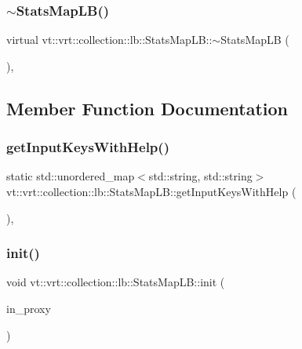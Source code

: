 \subsubsection{\texorpdfstring{$\sim$\+Stats\+Map\+L\+B()}{~StatsMapLB()}}
{\footnotesize\ttfamily virtual vt\+::vrt\+::collection\+::lb\+::\+Stats\+Map\+L\+B\+::$\sim$\+Stats\+Map\+LB (\begin{DoxyParamCaption}{ }\end{DoxyParamCaption})\hspace{0.3cm}{\ttfamily [virtual]}, {\ttfamily [default]}}



\subsection{Member Function Documentation}
\mbox{\label{structvt_1_1vrt_1_1collection_1_1lb_1_1_stats_map_l_b_ab795f35642e78ff8b01cdd7440a053e2}} 
\subsubsection{\texorpdfstring{get\+Input\+Keys\+With\+Help()}{getInputKeysWithHelp()}}
{\footnotesize\ttfamily static std\+::unordered\+\_\+map$<$std\+::string, std\+::string$>$ vt\+::vrt\+::collection\+::lb\+::\+Stats\+Map\+L\+B\+::get\+Input\+Keys\+With\+Help (\begin{DoxyParamCaption}{ }\end{DoxyParamCaption})\hspace{0.3cm}{\ttfamily [inline]}, {\ttfamily [static]}}

\mbox{\label{structvt_1_1vrt_1_1collection_1_1lb_1_1_stats_map_l_b_a5af7ebfa026d3b236fee88bc2b5d139e}} 
\subsubsection{\texorpdfstring{init()}{init()}}
{\footnotesize\ttfamily void vt\+::vrt\+::collection\+::lb\+::\+Stats\+Map\+L\+B\+::init (\begin{DoxyParamCaption}\item[{\hyperlink{structvt_1_1objgroup_1_1proxy_1_1_proxy}{objgroup\+::proxy\+::\+Proxy}$<$ \hyperlink{structvt_1_1vrt_1_1collection_1_1lb_1_1_stats_map_l_b}{Stats\+Map\+LB} $>$}]{in\+\_\+proxy }\end{DoxyParamCaption})}

